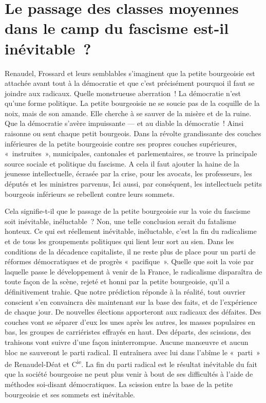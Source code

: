 \documentclass[french,twoside]{book} %
\begin{document}
\section[{Le passage des classes moyennes dans le camp du fascisme est-il inévitable ?}]{Le passage des classes moyennes dans le camp du fascisme est-il inévitable ?}
\noindent Renaudel, Frossard et leurs semblables s’imaginent que la petite bourgeoisie est attachée avant tout à la démocratie et que c’est précisément pourquoi il faut se joindre aux radicaux. Quelle monstrueuse aberration ! La démocratie n’est qu’une forme politique. La petite bourgeoisie ne se soucie pas de la coquille de la noix, mais de son amande. Elle cherche à se sauver de la misère et de la ruine. Que la démocratie s’avère impuissante — et au diable la démocratie ! Ainsi raisonne ou  sent chaque petit bourgeois. Dans la révolte grandissante des couches inférieures de la petite bourgeoisie contre ses propres couches supérieures, « instruites », municipales, cantonales et parlementaires, se trouve la principale source sociale et politique du fascisme. A cela il faut ajouter la haine de la jeunesse intellectuelle, écrasée par la crise, pour les avocats, les professeurs, les députés et les ministres parvenus, Ici aussi, par conséquent, les intellectuels petits bourgeois inférieurs se rebellent contre leurs sommets.\par
Cela signifie-t-il que le passage de la petite bourgeoisie sur la voie du fascisme soit inévitable, inéluctable ? Non, une telle conclusion serait du fatalisme honteux. Ce qui est réellement inévitable, inéluctable, c’est la fin du radicalisme et de tous les groupements politiques qui lient leur sort au sien. Dans les conditions de la décadence capitaliste, il ne reste plus de place pour un parti de réformes démocratiques et de progrès « pacifique ». Quelle que soit la voie par laquelle passe le développement à venir de la France, le radicalisme disparaîtra de toute façon de la scène, rejeté et honni par la petite bourgeoisie, qu’il a définitivement trahie. Que notre prédiction réponde à la réalité, tout ouvrier conscient s’en convaincra dès maintenant sur la base des faits, et de l’expérience de chaque jour. De nouvelles élections apporteront aux radicaux des défaites. Des couches vont se séparer d’eux les unes après les autres, les masses populaires en bas, les groupes de carriéristes effrayés en haut. Des départs, des scissions, des trahisons vont suivre d’une façon ininterrompue. Aucune manœuvre et aucun bloc ne sauveront le parti radical. Il entraînera avec lui dans l’abîme le « parti » de Renaudel-Déat et C\textsuperscript{ie}. La fin du parti radical est le résultat inévitable du fait que la société bourgeoise ne peut plus venir à bout de ses difficultés à l’aide de méthodes soi-disant démocratiques.  La scission entre la base de la petite bourgeoisie et ses sommets est inévitable.\par
\end{document}
